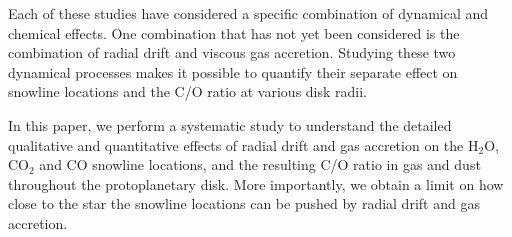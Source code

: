 \documentclass[apj]{emulateapj}
\newcommand{\emgr}[1]{\emph{ \color{gray} #1}}
\begin{document}
Each of these studies have considered a specific combination of dynamical and chemical effects. One combination that has not yet been considered is the combination of radial drift and viscous gas accretion. Studying these two dynamical processes makes it possible to quantify their separate effect on snowline locations and the C/O ratio at various disk radii.

In this paper, we perform a systematic study to understand the detailed qualitative and quantitative effects of radial drift and gas accretion on the H$_2$O, CO$_2$ and CO snowline locations, and the resulting C/O ratio in gas and dust throughout the protoplanetary disk. More importantly, we obtain a limit on how close to the star the snowline locations can be pushed by radial drift and gas accretion.   


\end{document}

